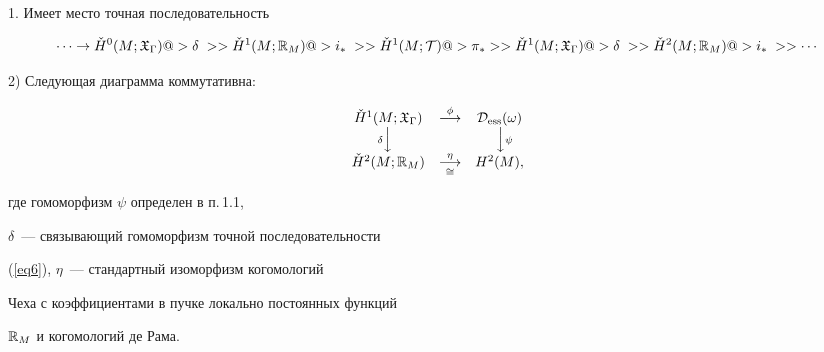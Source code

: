 \begin{cor}\label{cor1}


1. Имеет место точная последовательность


\begin{equation} \label{eq6}


\dotsb \to


\check H^0(M;\gX_\Gamma) @>{\delta\;}>>


\check H^1(M;\R_M) @>{i_*\;}>>


\check H^1(M;\cT)  @>{\pi_*}>>


\check H^1(M;\gX_\Gamma) @>{\delta\;}>>


\check H^2(M;\R_M) @>{i_*\;}>> \dotsb


\end{equation}





2) Следующая диаграмма коммутативна:


\begin{equation}\label{eq7}


\begin{array}{ccc}


\check{H}^1(M;\gX_\Gamma) & \overset{\phi}{\longrightarrow}


& \cD_{\ess}(\omega) \\


{\scriptstyle\delta}{\Big\downarrow}\phantom{\delta} & & \phantom{\psi}


{\Big\downarrow}{\scriptstyle\psi} \\


\check{H}^2(M;\R_M) & \underset{\cong}{\overset{\eta}{\longrightarrow}}


& H^2(M),


\end{array}


\end{equation}


где гомоморфизм $\psi$ определен в п.\,1.1,


$\delta$~--- связывающий гомоморфизм точной последовательности


(\ref{eq6}), $\eta$~--- стандартный изоморфизм когомологий


Чеха с коэффициентами в пучке локально постоянных функций


${\Bbb R}_M$ и когомологий де Рама.


\end{cor}





